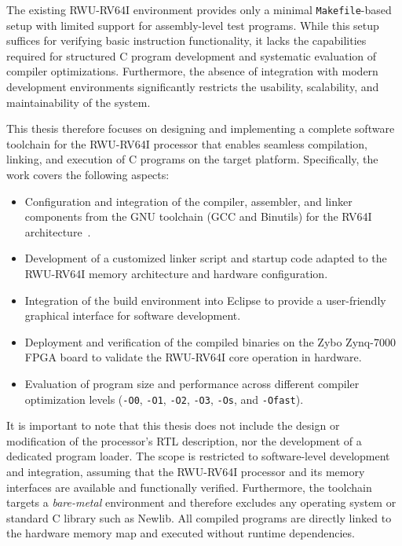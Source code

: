 The existing RWU-RV64I environment provides only a minimal \texttt{Makefile}-based setup with limited support for assembly-level test programs.  
While this setup suffices for verifying basic instruction functionality, it lacks the capabilities required for structured C program development and systematic evaluation of compiler optimizations.  
Furthermore, the absence of integration with modern development environments significantly restricts the usability, scalability, and maintainability of the system.

This thesis therefore focuses on designing and implementing a complete software toolchain for the RWU-RV64I processor that enables seamless compilation, linking, and execution of C programs on the target platform.  
Specifically, the work covers the following aspects:
\begin{itemize}
  \item Configuration and integration of the compiler, assembler, and linker components from the GNU toolchain (GCC and Binutils) for the RV64I architecture~\cite{gcc}.
  \item Development of a customized linker script and startup code adapted to the RWU-RV64I memory architecture and hardware configuration.
  \item Integration of the build environment into Eclipse to provide a user-friendly graphical interface for software development.
  \item Deployment and verification of the compiled binaries on the Zybo Zynq-7000 FPGA board to validate the RWU-RV64I core operation in hardware.
  \item Evaluation of program size and performance across different compiler optimization levels (\texttt{-O0}, \texttt{-O1}, \texttt{-O2}, \texttt{-O3}, \texttt{-Os}, and \texttt{-Ofast}).
\end{itemize}

It is important to note that this thesis does not include the design or modification of the processor’s RTL description, nor the development of a dedicated program loader.  
The scope is restricted to software-level development and integration, assuming that the RWU-RV64I processor and its memory interfaces are available and functionally verified.  
Furthermore, the toolchain targets a \emph{bare-metal} environment and therefore excludes any operating system or standard C library such as Newlib.  
All compiled programs are directly linked to the hardware memory map and executed without runtime dependencies.


